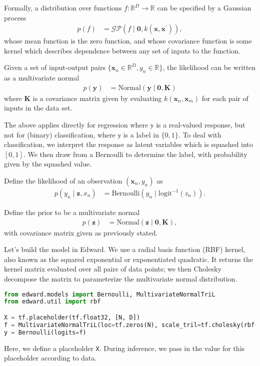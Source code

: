 Formally, a distribution over functions $f:\mathbb{R}^D\to\mathbb{R}$ can be specified
by a Gaussian process
\begin{align*}
  p(f)
  &=
  \mathcal{GP}(f\mid \mathbf{0}, k(\mathbf{x}, \mathbf{x}^\prime)),
\end{align*}
whose mean function is the zero function, and whose covariance
function is some kernel which describes dependence between
any set of inputs to the function.

Given a set of input-output pairs
$\{\mathbf{x}_n\in\mathbb{R}^D,y_n\in\mathbb{R}\}$,
the likelihood can be written as a multivariate normal
\begin{align*}
  p(\mathbf{y})
  &=
  \text{Normal}(\mathbf{y} \mid \mathbf{0}, \mathbf{K})
\end{align*}
where $\mathbf{K}$ is a covariance matrix given by evaluating
$k(\mathbf{x}_n, \mathbf{x}_m)$ for each pair of inputs in the data
set.

The above applies directly for regression where $\mathbb{y}$ is a
real-valued response, but not for (binary) classification, where $\mathbb{y}$
is a label in $\{0,1\}$. To deal with classification, we interpret the
response as latent variables which is squashed into $[0,1]$. We then
draw from a Bernoulli to determine the label, with probability given
by the squashed value.

Define the likelihood of an observation $(\mathbf{x}_n, y_n)$ as
\begin{align*}
  p(y_n \mid \mathbf{z}, x_n)
  &=
  \text{Bernoulli}(y_n \mid \text{logit}^{-1}(z_n)).
\end{align*}

Define the prior to be a multivariate normal
\begin{align*}
  p(\mathbf{z})
  &=
  \text{Normal}(\mathbf{z} \mid \mathbf{0}, \mathbf{K}),
\end{align*}
with covariance matrix given as previously stated.

Let's build the model in Edward. We use a radial basis function (RBF)
kernel, also known as the squared exponential or exponentiated
quadratic. It returns the kernel matrix evaluated over all pairs of
data points; we then Cholesky decompose the matrix to parameterize the
multivariate normal distribution.
\begin{lstlisting}[language=Python]
from edward.models import Bernoulli, MultivariateNormalTriL
from edward.util import rbf

X = tf.placeholder(tf.float32, [N, D])
f = MultivariateNormalTriL(loc=tf.zeros(N), scale_tril=tf.cholesky(rbf(X)))
y = Bernoulli(logits=f)
\end{lstlisting}
Here, we define a placeholder \texttt{X}. During inference, we pass in
the value for this placeholder according to data.

